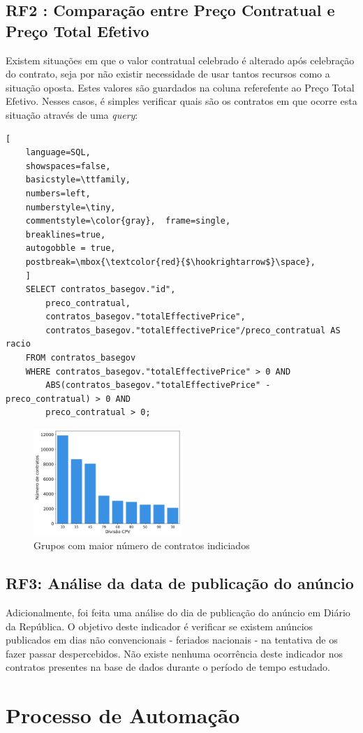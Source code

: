\subsection{RF2 : Comparação entre Preço Contratual e Preço Total Efetivo}

Existem situações em que o valor contratual celebrado é alterado após celebração do contrato, seja por não existir necessidade de usar tantos recursos como a situação oposta. Estes valores são guardados na coluna referefente ao Preço Total Efetivo. Nesses casos, é simples verificar quais são os contratos em que ocorre esta situação através de uma \textit{query}: 

\begin{lstlisting}[
	language=SQL,
	showspaces=false,
	basicstyle=\ttfamily,
	numbers=left,
	numberstyle=\tiny,
	commentstyle=\color{gray},	frame=single,
	breaklines=true,
	autogobble = true,
	postbreak=\mbox{\textcolor{red}{$\hookrightarrow$}\space},
	]
	SELECT contratos_basegov."id", 
		preco_contratual, 
		contratos_basegov."totalEffectivePrice", 
		contratos_basegov."totalEffectivePrice"/preco_contratual AS racio
	FROM contratos_basegov 
	WHERE contratos_basegov."totalEffectivePrice" > 0 AND 
		ABS(contratos_basegov."totalEffectivePrice" - preco_contratual) > 0 AND 
		preco_contratual > 0;
\end{lstlisting}


\begin{figure}[H]
	\centering
	\includegraphics[width=0.5\textwidth]{imagens/rf2/main_cpvs.png}
	\caption{Grupos com maior número de contratos indiciados}
	\label{}
\end{figure}



\subsection{RF3: Análise da data de publicação do anúncio}

Adicionalmente, foi feita uma análise do dia de publicação do anúncio em Diário da República. O objetivo deste indicador é verificar se existem anúncios publicados em dias não convencionais - feriados nacionais - na tentativa de os fazer passar despercebidos. Não existe nenhuma ocorrência deste indicador nos contratos presentes na base de dados durante o período de tempo estudado. 




\section{Processo de Automação}






